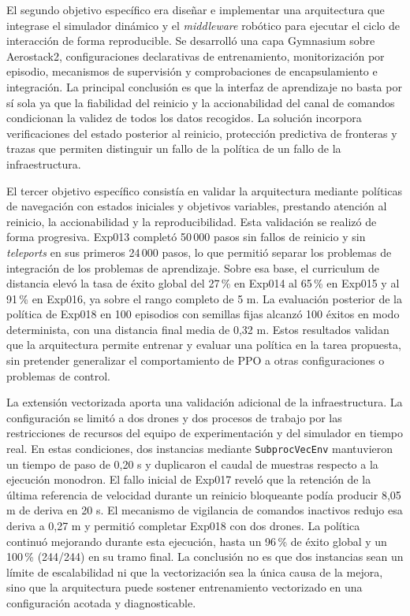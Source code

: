 El segundo objetivo específico era diseñar e implementar una arquitectura que
integrase el simulador dinámico y el \emph{middleware} robótico para ejecutar el
ciclo de interacción de forma reproducible. Se desarrolló una capa Gymnasium
sobre Aerostack2, configuraciones declarativas de entrenamiento, monitorización
por episodio, mecanismos de supervisión y comprobaciones de encapsulamiento e
integración. La principal conclusión es que la interfaz de
aprendizaje no basta por sí sola ya que la fiabilidad del reinicio y la accionabilidad
del canal de comandos condicionan la validez de todos los datos recogidos. La
solución incorpora verificaciones del estado posterior al reinicio, protección
predictiva de fronteras y trazas que permiten distinguir un fallo de la política
de un fallo de la infraestructura.

El tercer objetivo específico consistía en validar la arquitectura mediante políticas
de navegación con estados iniciales y objetivos variables, prestando atención al
reinicio, la accionabilidad y la reproducibilidad. Esta validación se realizó de
forma progresiva. Exp013 completó 50\,000 pasos sin fallos de reinicio y sin
\emph{teleports} en sus primeros 24\,000 pasos, lo que permitió separar los
problemas de integración de los problemas de aprendizaje. Sobre esa base, el
curriculum de distancia elevó la tasa de éxito global del 27\,\% en Exp014 al
65\,\% en Exp015 y al 91\,\% en Exp016, ya sobre el rango completo de 5 m. La
evaluación posterior de la política de Exp018 en 100 episodios con semillas
fijas alcanzó 100 éxitos en modo determinista, con una distancia final media de
0,32 m. Estos resultados validan que la arquitectura permite entrenar y evaluar una
política en la tarea propuesta, sin pretender generalizar el comportamiento de
PPO a otras configuraciones o problemas de control.

La extensión vectorizada aporta una validación adicional de la infraestructura.
La configuración se limitó a dos drones y dos procesos de trabajo por las
restricciones de recursos del equipo de experimentación y del simulador en tiempo
real. En estas condiciones, dos instancias mediante \texttt{SubprocVecEnv}
mantuvieron un tiempo de paso de 0,20 s y duplicaron el caudal de muestras
respecto a la ejecución monodron. El fallo inicial de Exp017 reveló que la
retención de la última referencia de velocidad durante un reinicio bloqueante
podía producir 8,05 m de deriva en 20 s. El mecanismo de vigilancia de comandos
inactivos redujo esa deriva a 0,27 m y permitió completar Exp018 con dos drones.
La política continuó mejorando durante esta ejecución, hasta un 96\,\% de éxito
global y un 100\,\% (244/244) en su tramo final. La conclusión no es que dos
instancias sean un límite de escalabilidad ni que la vectorización sea la única
causa de la mejora, sino que la arquitectura puede sostener entrenamiento vectorizado
en una configuración acotada y diagnosticable.

